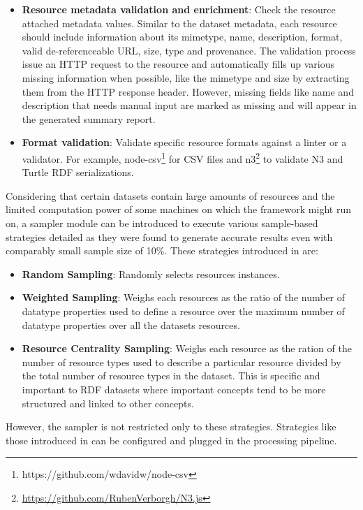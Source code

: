 \documentclass[runningheads,a4paper]{llncs}
\begin{document}
\begin{itemize}
  \item \textbf{Resource metadata validation and enrichment}: Check the resource attached metadata values. Similar to the dataset metadata, each resource should include information about its mimetype, name, description, format, valid de-referenceable URL, size, type and provenance. The validation process issue an HTTP request to the resource and automatically fills up various missing information when possible, like the mimetype and size by extracting them from the HTTP response header. However, missing fields like name and description that needs manual input are marked as missing and will appear in the generated summary report.
  \item \textbf{Format validation}: Validate specific resource formats against a linter or a validator. For example, node-csv\footnote{https://github.com/wdavidw/node-csv} for CSV files and n3\footnote{\url{https://github.com/RubenVerborgh/N3.js}} to validate N3 and Turtle RDF serializations.
\end{itemize}

Considering that certain datasets contain large amounts of resources and the limited computation power of some machines on which the framework might run on, a sampler module can be introduced to execute various sample-based strategies detailed as they were found to generate accurate results even with comparably small sample size of 10\%. These strategies introduced in \cite{scalableApproach} are:

\begin{itemize}
  \item \textbf{Random Sampling}: Randomly selects resources instances.
  \item \textbf{Weighted Sampling}: Weighs each resources as the ratio of the number of datatype properties used to define a resource over the maximum number of datatype properties over all the datasets resources.
  \item \textbf{Resource Centrality Sampling}: Weighs each resource as the ration of the number of resource types used to describe a particular resource divided by the total number of resource types in the dataset. This is specific and important to RDF datasets where important concepts tend to be more structured and linked to other concepts.
\end{itemize}

However, the sampler is not restricted only to these strategies. Strategies like those introduced in \cite{Leskovec:2006:SLG:1150402.1150479} can be configured and plugged in the processing pipeline.
\end{document}
